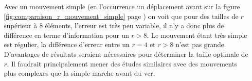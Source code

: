 Avec un mouvement simple (en l'occurrence un déplacement avant sur la figure
\ref{fig:comparaison_r_mouvement_simple} page
\pageref{fig:comparaison_r_mouvement_simple}) on voit que pour des tailles de $r$
supérieur à 8 éléments, l'erreur est très peu variable, il n'y a donc plus de différence
en terme d'information pour un $r > 8$. Le mouvement étant très simple est régulier,
la différence d'erreur entre un $r = 4$ et $r > 8$ n'est pas grande. 
D'avantages de résultats seraient nécessaires pour déterminer la taille optimale de $r$. 
Il faudrait principalement mener des études similaires avec des mouvements plus complexes
que la simple marche avant du ver.



%




